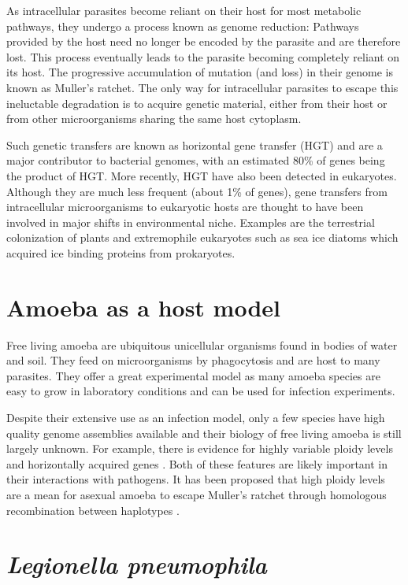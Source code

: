 As intracellular parasites become reliant on their host for most metabolic pathways, they undergo a process known as genome reduction: Pathways provided by the host need no longer be encoded by the parasite and are therefore lost. This process eventually leads to the parasite becoming completely reliant on its host. The progressive accumulation of mutation (and loss) in their genome is known as Muller's ratchet. The only way for intracellular parasites to escape this ineluctable degradation is to acquire genetic material, either from their host or from other microorganisms sharing the same host cytoplasm.

Such genetic transfers are known as horizontal gene transfer (HGT) and are a major contributor to bacterial genomes, with an estimated 80\% of genes being the product of HGT. More recently, HGT have also been detected in eukaryotes. Although they are much less frequent (about 1\% of genes), gene transfers from intracellular microorganisms to eukaryotic hosts are thought to have been involved in major shifts in environmental niche. Examples are the terrestrial colonization of plants and extremophile eukaryotes such as sea ice diatoms which acquired ice binding proteins from prokaryotes.

\section{Amoeba as a host model}

Free living amoeba are ubiquitous unicellular organisms found in bodies of water and soil. They feed on microorganisms by phagocytosis and are host to many parasites. They offer a great experimental model as many amoeba species are easy to grow in laboratory conditions and can be used for infection experiments.

Despite their extensive use as an infection model, only a few species have high quality genome assemblies available and their biology of free living amoeba is still largely unknown. For example, there is evidence for highly variable ploidy levels and horizontally acquired genes \cite{clarke2013}. Both of these features are likely important in their interactions with pathogens. It has been proposed that high ploidy levels are a mean for asexual amoeba to escape Muller's ratchet through homologous recombination between haplotypes \cite{Maciver2016}.

\section{\textit{Legionella pneumophila}}

